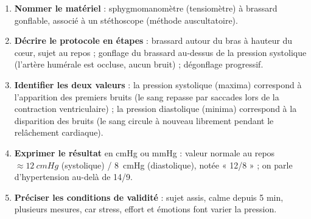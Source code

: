 \documentclass[11pt]{article}
\newcommand{\cle}[1]{{\popxbold\color{popdark}#1}}
\begin{document}
\begin{methode}
\begin{enumerate}
\item \textbf{Nommer le matériel} : sphygmomanomètre (tensiomètre) à brassard gonflable, associé à un stéthoscope (méthode auscultatoire).
\item \textbf{Décrire le protocole en étapes} : brassard autour du bras à hauteur du c\oe ur, sujet au repos ; gonflage du brassard au-dessus de la pression systolique (l'artère humérale est occluse, aucun bruit) ; dégonflage progressif.
\item \textbf{Identifier les deux valeurs} : la \cle{pression systolique} (maxima) correspond à l'apparition des premiers bruits (le sang repasse par saccades lors de la contraction ventriculaire) ; la \cle{pression diastolique} (minima) correspond à la disparition des bruits (le sang circule à nouveau librement pendant le relâchement cardiaque).
\item \textbf{Exprimer le résultat} en cmHg ou mmHg : valeur normale au repos $\approx \SI{12}{cmHg}$ (systolique) / \SI{8}{cmHg} (diastolique), notée « 12/8 » ; on parle d'hypertension au-delà de 14/9.
\item \textbf{Préciser les conditions de validité} : sujet assis, calme depuis 5 min, plusieurs mesures, car stress, effort et émotions font varier la pression.
\end{enumerate}
\end{methode}
\end{document}
